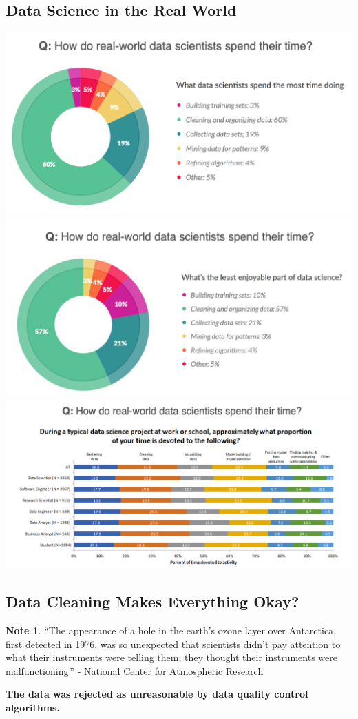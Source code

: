 \documentclass[11pt]{article}
\theoremstyle{definition}
\newtheorem{note}{Note}
\begin{document}
\subsection{Data Science in the Real World}
\includegraphics[width=\textwidth/2-2.08049pt]{3.png}
\includegraphics[width=\textwidth/2]{4.png}
\includegraphics[width=\textwidth]{5.png}

\subsection{Data Cleaning Makes Everything Okay?}
\begin{note}
    “The appearance of a hole in the
earth's ozone layer over
Antarctica, first detected in 1976,
was so unexpected that scientists
didn't pay attention to what their
instruments were telling them;
they thought their instruments
were malfunctioning.”
- National Center for
Atmospheric Research
\end{note}
\textbf{The data was rejected as unreasonable by data quality control algorithms.}
\end{document}
